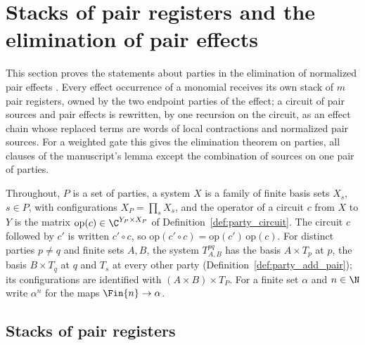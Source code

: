 \section{Stacks of pair registers and the elimination of pair effects}
\label{sec:party_effect_stacks}

This section proves the statements about parties in the elimination of
normalized pair effects \cite[Lemma~5.1]{OpenAI2026PolynomialPEPS}. Every effect
occurrence of a monomial receives its own stack of $m$ pair registers, owned by
the two endpoint parties of the effect; a circuit of pair sources and pair
effects is rewritten, by one recursion on the circuit, as an effect chain whose
replaced terms are words of local contractions and normalized pair sources. For a
weighted gate this gives the elimination theorem on parties, all clauses of the
manuscript's lemma except the combination of sources on one pair of parties.

Throughout, $P$ is a set of parties, a system $X$ is a family of finite basis
sets $X_s$, $s\in P$, with configurations $X_P=\prod_sX_s$, and the operator of a
circuit $c$ from $X$ to $Y$ is the matrix $\mathrm{op}(c)\in\C^{Y_P\times X_P}$
of Definition~\ref{def:party_circuit}. The circuit $c$ followed by $c'$ is
written $c'\circ c$, so $\mathrm{op}(c'\circ c)=\mathrm{op}(c')\,\mathrm{op}(c)$.
For distinct parties $p\ne q$ and finite sets $A,B$, the system $T^{pq}_{A,B}$ has
the basis $A\times T_p$ at $p$, the basis $B\times T_q$ at $q$ and $T_s$ at every
other party (Definition~\ref{def:party_add_pair}); its configurations are
identified with $(A\times B)\times T_P$. For a finite set $\alpha$ and $n\in\N$
write $\alpha^n$ for the maps $\Fin{n}\to\alpha$.

\subsection{Stacks of pair registers}
\label{sec:party_stacks}

